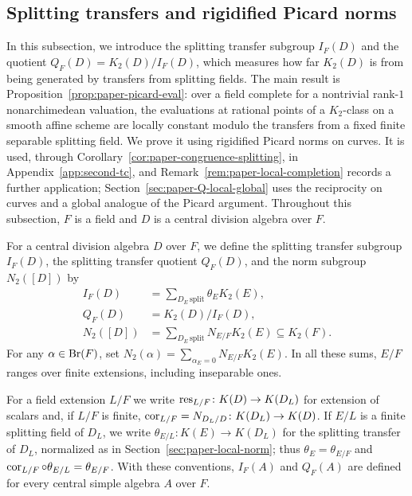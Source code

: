 \subsection{Splitting transfers and rigidified Picard norms}\label{sec:paper-splitting}
In this subsection, we introduce the splitting transfer subgroup $I_F(D)$ and the quotient $Q_F(D)=K_2(D)/I_F(D)$, which measures how far $K_2(D)$ is from being generated by transfers from splitting fields.
The main result is Proposition~\ref{prop:paper-picard-eval}: over a field complete for a nontrivial rank-$1$ nonarchimedean valuation, the evaluations at rational points of a $K_2$-class on a smooth affine scheme are locally constant modulo the transfers from a fixed finite separable splitting field.
We prove it using rigidified Picard norms on curves.
It is used, through Corollary~\ref{cor:paper-congruence-splitting}, in Appendix~\ref{app:second-tc}, and Remark~\ref{rem:paper-local-completion} records a further application; Section~\ref{sec:paper-Q-local-global} uses the reciprocity on curves and a global analogue of the Picard argument.
Throughout this subsection, $F$ is a field and $D$ is a central division algebra over $F$.

\begin{definition}\label{def:paper-transfer}
For a central division algebra $D$ over $F$, we define the splitting transfer subgroup $I_F(D)$, the splitting transfer quotient $Q_F(D)$, and the norm subgroup $N_2([D])$ by
\[
 \begin{split}
 I_F(D)&=\sum_{D_E\,\mathrm{split}}\theta_E K_2(E),\\
 Q_F(D)&=K_2(D)/I_F(D),\\
 N_2([D])&=\sum_{D_E\,\mathrm{split}}N_{E/F}K_2(E)\subseteq K_2(F).
 \end{split}
\]
For any $\alpha\in\operatorname{Br}(F)$, set $N_2(\alpha)=\sum_{\alpha_E=0}N_{E/F}K_2(E)$.
In all these sums, $E/F$ ranges over finite extensions, including inseparable ones.
\end{definition}

For a field extension $L/F$ we write $\operatorname{res}_{L/F}\colon K(D)\to K(D_L)$ for extension of scalars and, if $L/F$ is finite, $\operatorname{cor}_{L/F}=N_{D_L/D}\colon K(D_L)\to K(D)$.
If $E/L$ is a finite splitting field of $D_L$, we write $\theta_{E/L}\colon K(E)\to K(D_L)$ for the splitting transfer of $D_L$, normalized as in Section~\ref{sec:paper-local-norm}; thus $\theta_E=\theta_{E/F}$ and $\operatorname{cor}_{L/F}\circ\theta_{E/L}=\theta_{E/F}$.
With these conventions, $I_F(A)$ and $Q_F(A)$ are defined for every central simple algebra $A$ over $F$.

